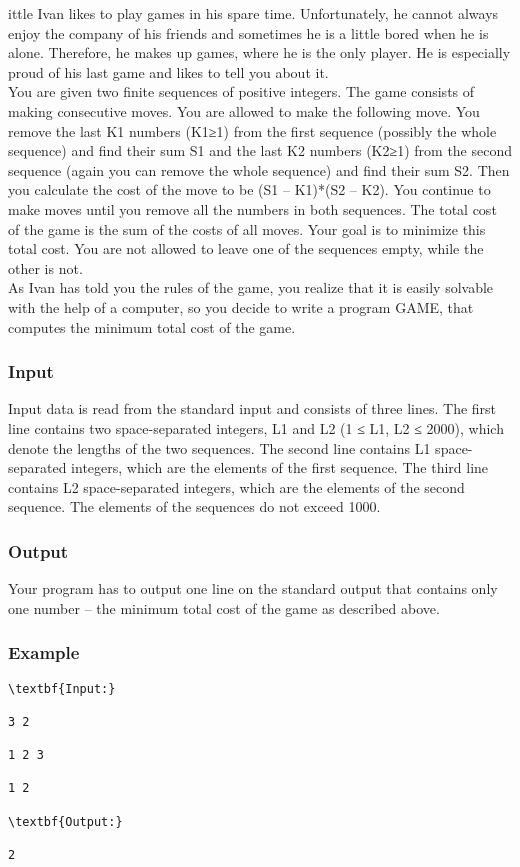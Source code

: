 



ittle Ivan likes to play games in his spare time. Unfortunately, he cannot always enjoy the company of his friends and sometimes he is a little bored when he is alone. Therefore, he makes up games, where he is the only player. He is especially proud of his last game and likes to tell you about it. 
\\

 You are given two finite sequences of positive integers. The game consists of making consecutive moves. You are allowed to make the following move. You remove the last K1 numbers (K1≥1) from the first sequence (possibly the whole sequence) and find their sum S1 and the last K2 numbers (K2≥1) from the second sequence (again you can remove the whole sequence) and find their sum S2. Then you calculate the cost of the move to be (S1 – K1)*(S2 – K2). You continue to make moves until you remove all the numbers in both sequences. The total cost of the game is the sum of the costs of all moves. Your goal is to minimize this total cost. You are not allowed to leave one of the sequences empty, while the other is not. 
\\

 As Ivan has told you the rules of the game, you realize that it is easily solvable with the help of a computer, so you decide to write a program GAME, that computes the minimum total cost of the game.

 

 

\subsubsection{Input}

 Input data is read from the standard input and consists of three lines. The first line contains two space-separated integers, L1 and L2 (1 ≤ L1, L2 ≤ 2000), which denote the lengths of the two sequences. The second line contains L1 space-separated integers, which are the elements of the first sequence. The third line contains L2 space-separated integers, which are the elements of the second sequence. The elements of the sequences do not exceed 1000.

 

 

\subsubsection{Output}

Your program has to output one line on the standard output that contains only one number – the minimum total cost of the game as described above.

 

 

\subsubsection{Example}
\begin{verbatim}
\textbf{Input:}

3 2

1 2 3

1 2

\textbf{Output:}

2

\end{verbatim}

